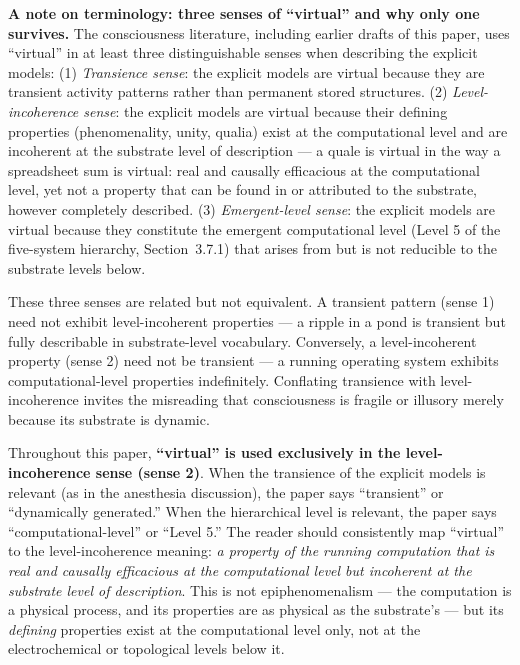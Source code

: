 \documentclass[12pt]{article}
\newcommand{\revstart}{}
\newcommand{\revend}{}
\begin{document}
{\revstart\textbf{A note on terminology: three senses of ``virtual'' and why only one survives.} The consciousness literature, including earlier drafts of this paper, uses ``virtual'' in at least three distinguishable senses when describing the explicit models: (1) \emph{Transience sense}: the explicit models are virtual because they are transient activity patterns rather than permanent stored structures. (2) \emph{Level-incoherence sense}: the explicit models are virtual because their defining properties (phenomenality, unity, qualia) exist at the computational level and are incoherent at the substrate level of description --- a quale is virtual in the way a spreadsheet sum is virtual: real and causally efficacious at the computational level, yet not a property that can be found in or attributed to the substrate, however completely described. (3) \emph{Emergent-level sense}: the explicit models are virtual because they constitute the emergent computational level (Level 5 of the five-system hierarchy, Section~3.7.1) that arises from but is not reducible to the substrate levels below.

These three senses are related but not equivalent. A transient pattern (sense 1) need not exhibit level-incoherent properties --- a ripple in a pond is transient but fully describable in substrate-level vocabulary. Conversely, a level-incoherent property (sense 2) need not be transient --- a running operating system exhibits computational-level properties indefinitely. Conflating transience with level-incoherence invites the misreading that consciousness is fragile or illusory merely because its substrate is dynamic.

Throughout this paper, \textbf{``virtual'' is used exclusively in the level-incoherence sense (sense 2)}. When the transience of the explicit models is relevant (as in the anesthesia discussion), the paper says ``transient'' or ``dynamically generated.'' When the hierarchical level is relevant, the paper says ``computational-level'' or ``Level 5.'' The reader should consistently map ``virtual'' to the level-incoherence meaning: \emph{a property of the running computation that is real and causally efficacious at the computational level but incoherent at the substrate level of description}. This is not epiphenomenalism --- the computation is a physical process, and its properties are as physical as the substrate's --- but its \emph{defining} properties exist at the computational level only, not at the electrochemical or topological levels below it.\revend}
\end{document}
